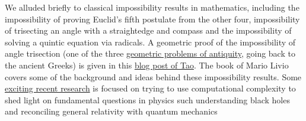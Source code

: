 We alluded briefly to classical impossibility results in mathematics,
including the impossibility of proving Euclid's fifth postulate from the
other four, impossibility of trisecting an angle with a straightedge and
compass and the impossibility of solving a quintic equation via
radicals. A geometric proof of the impossibility of angle trisection
(one of the three
\href{http://mathworld.wolfram.com/GeometricProblemsofAntiquity.html}{geometric
problems of antiquity}, going back to the ancient Greeks) is given in
this
\href{https://terrytao.wordpress.com/2011/08/10/a-geometric-proof-of-the-impossibility-of-angle-trisection-by-straightedge-and-compass/}{blog
post of Tao}. The book of Mario Livio \cite{Livio05} covers some of the
background and ideas behind these impossibility results. Some
\href{http://www.scottaaronson.com/barbados-2016.pdf}{exciting recent
research} is focused on trying to use computational complexity to shed
light on fundamental questions in physics such understanding black holes
and reconciling general relativity with quantum mechanics
